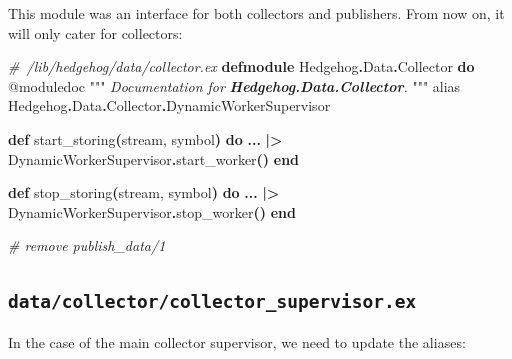 \documentclass[
  oneside]{book}
\newenvironment{Shaded}{\begin{snugshade}}{\end{snugshade}}
\newcommand{\CommentTok}[1]{\textcolor[rgb]{0.56,0.35,0.01}{\textit{#1}}}
\newcommand{\ConstantTok}[1]{\textcolor[rgb]{0.56,0.35,0.01}{#1}}
\newcommand{\FunctionTok}[1]{\textcolor[rgb]{0.13,0.29,0.53}{\textbf{#1}}}
\newcommand{\ImportTok}[1]{#1}
\newcommand{\InformationTok}[1]{\textcolor[rgb]{0.56,0.35,0.01}{\textbf{\textit{#1}}}}
\newcommand{\KeywordTok}[1]{\textcolor[rgb]{0.13,0.29,0.53}{\textbf{#1}}}
\newcommand{\NormalTok}[1]{#1}
\newcommand{\OperatorTok}[1]{\textcolor[rgb]{0.81,0.36,0.00}{\textbf{#1}}}
\newcommand{\OtherTok}[1]{\textcolor[rgb]{0.56,0.35,0.01}{#1}}
\begin{document}
This module was an interface for both collectors and publishers. From now on, it will only cater for collectors:

\begin{Shaded}
\begin{Highlighting}[]
\CommentTok{\# /lib/hedgehog/data/collector.ex}
\KeywordTok{defmodule} \ConstantTok{Hedgehog}\OperatorTok{.}\ConstantTok{Data}\OperatorTok{.}\ConstantTok{Collector} \KeywordTok{do}
  \OtherTok{@moduledoc """}
\CommentTok{ Documentation for }\InformationTok{\textasciigrave{}Hedgehog.Data.Collector\textasciigrave{}}\CommentTok{.}
\CommentTok{ }\OtherTok{"""}
  \ImportTok{alias} \ConstantTok{Hedgehog}\OperatorTok{.}\ConstantTok{Data}\OperatorTok{.}\ConstantTok{Collector}\OperatorTok{.}\ConstantTok{DynamicWorkerSupervisor}

  \KeywordTok{def}\NormalTok{ start\_storing}\FunctionTok{(}\NormalTok{stream, symbol}\FunctionTok{)} \KeywordTok{do}
    \OperatorTok{...}
    \OperatorTok{|\textgreater{}} \ConstantTok{DynamicWorkerSupervisor}\OperatorTok{.}\NormalTok{start\_worker}\FunctionTok{()}
  \KeywordTok{end}

  \KeywordTok{def}\NormalTok{ stop\_storing}\FunctionTok{(}\NormalTok{stream, symbol}\FunctionTok{)} \KeywordTok{do}
    \OperatorTok{...}
    \OperatorTok{|\textgreater{}} \ConstantTok{DynamicWorkerSupervisor}\OperatorTok{.}\NormalTok{stop\_worker}\FunctionTok{()}
  \KeywordTok{end}

  \CommentTok{\# remove \textasciigrave{}publish\_data/1\textasciigrave{}}
\end{Highlighting}
\end{Shaded}

\subsection{\texorpdfstring{\texttt{data/collector/collector\_supervisor.ex}}{data/collector/collector\_supervisor.ex}}\label{datacollectorcollector_supervisor.ex}

In the case of the main collector supervisor, we need to update the aliases:
\end{document}
